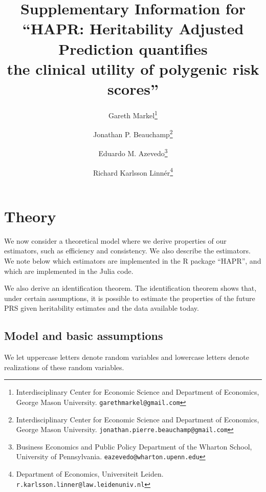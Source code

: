 \documentclass[12pt]{article}
\begin{document}
\title{Supplementary Information for ``HAPR: Heritability Adjusted Prediction quantifies\\
the clinical utility of polygenic risk scores''}

\author{
  Gareth Markel\thanks{Interdisciplinary Center for Economic Science and Department of Economics, George Mason University. \texttt{garethmarkel@gmail.com}} \and
  Jonathan P. Beauchamp\thanks{Interdisciplinary Center for Economic Science and Department of Economics, George Mason University. \texttt{jonathan.pierre.beauchamp@gmail.com}} \and
  Eduardo M. Azevedo\thanks{Business Economics and Public Policy Department of the Wharton School, University of Pennsylvania. \texttt{eazevedo@wharton.upenn.edu}} \and
  Richard Karlsson Linnér\thanks{Department of Economics, Universiteit Leiden. \texttt{r.karlsson.linner@law.leidenuniv.nl}}
}

\date{}

\maketitle

\section{Theory}

We now consider a theoretical model where we derive properties of our estimators, such as efficiency and consistency. We also describe the estimators. We note below which estimators are implemented in the R package ``HAPR'', and which are implemented in the Julia code.

We also derive an identification theorem. The identification theorem shows that, under certain assumptions, it is possible to estimate the properties of the future PRS given heritability estimates and the data available today.


\subsection{Model and basic assumptions}
We let uppercase letters denote random variables and lowercase letters denote realizations of these random variables.
\end{document}
